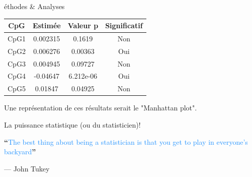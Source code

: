 \begin{frame}[allowframebreaks]{éthodes \& Analyses}
\begin{center}
\begin{tabular}{cccc}
        \hline
        CpG & Estimée & Valeur p & Significatif\\
        \hline
        CpG1 & 0.002315 & 0.1619 & Non\\
        CpG2 & 0.006276 & 0.00363 & Oui\\
        CpG3 & 0.004945 & 0.09727 & Non\\
        CpG4 & -0.04647 & 6.212e-06 & Oui\\
        CpG5 & 0.01847 & 0.04925 & Non\\
        \hline
    \end{tabular}
\end{center}
\framebreak
\par{Une représentation de ces résultats serait le "Manhattan plot".}
\begin{center}
\end{center}
\framebreak
\par{La puissance statistique (ou du statisticien)!}
\begin{center}
\end{center}
\end{frame}

\begin{frame}[allowframebreaks]{}
    \begin{center}
        \huge {\rmfamily \textbf{``}}\textcolor{dodgerblue}{The best thing about being a statistician is that you get to play in everyone's backyard}{\rmfamily \textbf{''}}\vspace{-1em}\begin{flushright}--- John Tukey\end{flushright}
    \end{center}
\end{frame}

